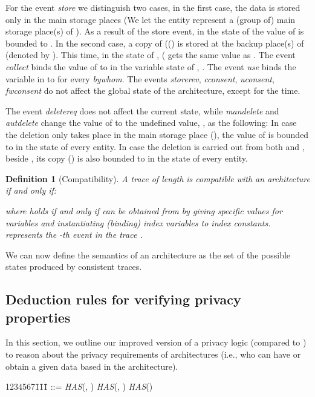 \documentclass[a4paper]{article}
\newtheorem{ttd}{Definition}
\begin{document}
For the event \textit{store} we distinguish two cases, in the first case, the data is stored only in the main storage places (We let the entity  represent a (group of) main storage place(s) of ). As a result of the store event, in the state of  the value of  is bounded to .  In the second case, a copy of  (() is stored at the backup place(s) of   (denoted by ). This time, in the state of , ( gets the same value  as . The event \textit{collect}  binds the value of  to  in the variable state of , . The event \textit{use} binds the variable in  to  for every   \textit{bywhom}. The events \textit{storerev}, \textit{cconsent}, \textit{uconsent}, \textit{fwconsent} do not affect the global state of the architecture, except for the time.       

The event \textit{deletereq} does not affect the current state, while \textit{mandelete} and \textit{autdelete} change the value of  to the undefined value, , as the following: In case the deletion only takes place in the main storage place (), the value of  is bounded to  in the state of every entity. In case the deletion is carried out from both  and , beside , its copy () is also bounded to  in the state of every entity. 
 
\begin{ttd}[Compatibility] A trace  of length   is  compatible with an architecture  if and only if:

where  holds if and only if  can be obtained from  by giving specific values for variables and instantiating (binding) index variables to index constants.  represents the -th event in the trace .  
\end{ttd}

We can now define the semantics of an architecture  as the set of the possible states produced by consistent traces. 

\subsection{Deduction rules for verifying privacy properties}
\label{sec:plogic0}

In this section, we outline our improved version of a privacy logic (compared to \cite{TaAntignac14}) to reason about the privacy requirements of architectures (i.e., who can have or obtain a given data based in the architecture).  

\begin{tabbing}    
    1234567\=1\=1\=1\= \kill
    \>  ::=  \textit{HAS}(, )  \textit{HAS}(, )  \textit{HAS}()    \\ 
\end{tabbing}
\end{document}
